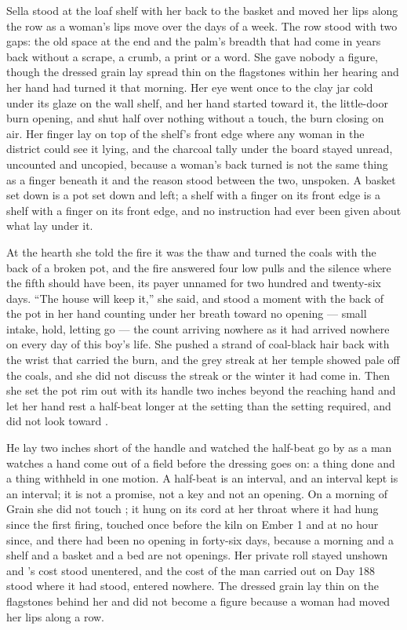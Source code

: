 Sella stood at the loaf shelf with her back to the basket and moved her lips along the row as a woman's lips move over the days of a week. The row stood with two gaps: the old space at the end and the palm's breadth that had come in years back without a scrape, a crumb, a print or a word. She gave nobody a figure, though the dressed grain lay spread thin on the flagstones within her hearing and her hand had turned it that morning. Her eye went once to the clay jar cold under its glaze on the wall shelf, and her hand started toward it, the little-door burn opening, and shut half over nothing without a touch, the burn closing on air. Her finger lay on top of the shelf's front edge where any woman in the district could see it lying, and the charcoal tally under the board stayed unread, uncounted and uncopied, because a woman's back turned is not the same thing as a finger beneath it and the reason stood between the two, unspoken. A basket set down is a pot set down and left; a shelf with a finger on its front edge is a shelf with a finger on its front edge, and no instruction had ever been given about what lay under it.

At the hearth she told the fire it was the thaw and turned the coals with the back of a broken pot, and the fire answered four low pulls and the silence where the fifth should have been, its payer unnamed for two hundred and twenty-six days. “The house will keep it,” she said, and stood a moment with the back of the pot in her hand counting under her breath toward no opening --- small intake, hold, letting go --- the count arriving nowhere as it had arrived nowhere on every day of this boy's life. She pushed a strand of coal-black hair back with the wrist that carried the burn, and the grey streak at her temple showed pale off the coals, and she did not discuss the streak or the winter it had come in. Then she set the pot rim out with its handle two inches beyond the reaching hand and let her hand rest a half-beat longer at the setting than the setting required, and did not look toward .

He lay two inches short of the handle and watched the half-beat go by as a man watches a hand come out of a field before the dressing goes on: a thing done and a thing withheld in one motion. A half-beat is an interval, and an interval kept is an interval; it is not a promise, not a key and not an opening. On a morning of Grain she did not touch ; it hung on its cord at her throat where it had hung since the first firing, touched once before the kiln on Ember 1 and at no hour since, and there had been no opening in forty-six days, because a morning and a shelf and a basket and a bed are not openings. Her private roll stayed unshown and 's cost stood unentered, and the cost of the man carried out on Day 188 stood where it had stood, entered nowhere. The dressed grain lay thin on the flagstones behind her and did not become a figure because a woman had moved her lips along a row.

